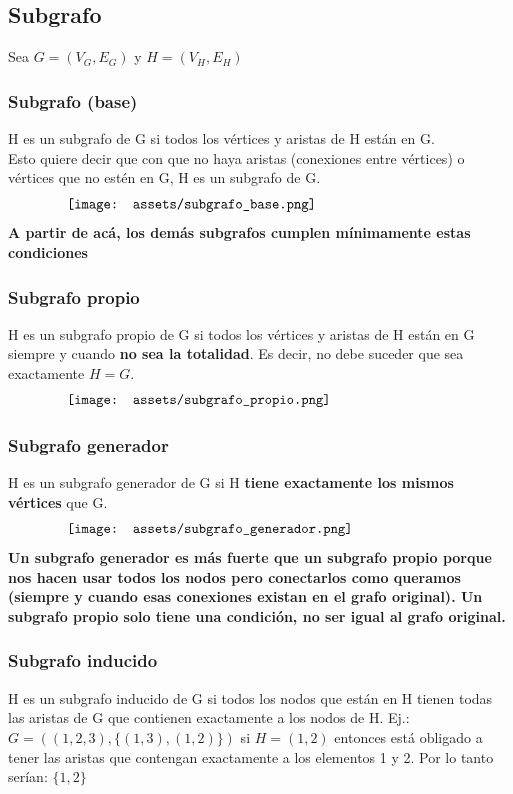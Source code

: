 \documentclass[10pt,a4paper]{article}
\begin{document}
\subsection*{Subgrafo}
Sea $G = (V_{G}, E_{G})$ y $H = (V_{H}, E_{H})$ 
\subsubsection*{Subgrafo (base)}
H es un subgrafo de G si todos los vértices y aristas de H están en G. \\
Esto quiere decir que con que no haya aristas (conexiones entre vértices) o vértices que no estén en G, H es un subgrafo de G.
\[\begin{minipage}[b]{0.8\textwidth}
    \texttt{[image: assets/subgrafo\_base.png]}
\end{minipage}\]
\textbf{A partir de acá, los demás subgrafos cumplen mínimamente estas condiciones}
\subsubsection*{Subgrafo propio}
H es un subgrafo propio de G si todos los vértices y aristas de H están en G siempre y cuando \textbf{no sea la totalidad}. Es decir, no debe suceder que sea exactamente $H = G$.
\[\begin{minipage}[b]{0.8\textwidth}
    \texttt{[image: assets/subgrafo\_propio.png]}
\end{minipage}\]
\subsubsection*{Subgrafo generador}
H es un subgrafo generador de G si H \textbf{tiene exactamente los mismos vértices} que G. 
\[\begin{minipage}[b]{0.8\textwidth}
    \texttt{[image: assets/subgrafo\_generador.png]}
\end{minipage}\]
\textbf{Un subgrafo generador es más fuerte que un subgrafo propio porque nos hacen usar todos los nodos pero conectarlos como queramos (siempre y cuando esas conexiones existan en el grafo original). Un subgrafo propio solo tiene una condición, no ser igual al grafo original.}
\subsubsection*{Subgrafo inducido}
H es un subgrafo inducido de G si todos los nodos que están en H tienen todas las aristas de G que contienen exactamente a los nodos de H. 
Ej.: $G = ((1, 2, 3), \{(1,3), (1,2)\})$ si $H = (1,2)$ entonces está obligado a tener las aristas que contengan exactamente a los elementos 1 y 2. Por lo tanto serían: $\{1, 2\}$ 
\end{document}

